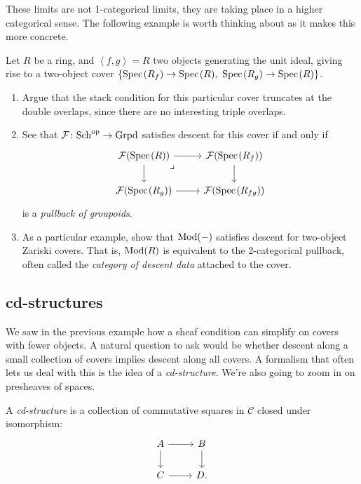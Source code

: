\documentclass[11pt]{amsart}
\begin{document}
\begin{remark} These limits are not 1-categorical limits, they are taking place in a higher categorical sense. The following example is worth thinking about as it makes this more concrete.
\end{remark}

\begin{example} Let $R$ be a ring, and $\left\langle f,g \right\rangle = R$ two objects generating the unit ideal, giving rise to a two-object cover $\left\{ \text{Spec}\hspace{0.1em}(R_f) \to \text{Spec}\hspace{0.1em}(R),\ \text{Spec}\hspace{0.1em}(R_g) \to \text{Spec}\hspace{0.1em}(R) \right\}$.
\begin{enumerate}
    \item Argue that the stack condition for this particular cover truncates at the double overlaps, since there are no interesting triple overlaps.
    \item See that $\mathcal{F} \colon \mathrm{Sch}^{\mathrm{op}} \to \mathrm{Grpd}$ satisfies descent for this cover if and only if
\[ \begin{tikzcd}
    \mathcal{F}(\Spec(R))\rar\dar\pb & \mathcal{F}(\Spec(R_f))\dar\\
    \mathcal{F}(\Spec(R_g))\rar & \mathcal{F}(\Spec(R_{fg}))
\end{tikzcd} \]
is a \textit{pullback of groupoids}.

    \item As a particular example, show that $\mathrm{Mod}(-)$ satisfies descent for two-object Zariski covers. That is, $\mathrm{Mod}(R)$ is equivalent to the 2-categorical pullback, often called the \textit{category of descent data} attached to the cover.
\end{enumerate}
\end{example}

\subsection{cd-structures} We saw in the previous example how a sheaf condition can simplify on covers with fewer objects. A natural question to ask would be whether descent along a small collection of covers implies descent along all covers. A formalism that often lets us deal with this is the idea of a \textit{cd-structure}. We're also going to zoom in on presheaves of spaces.

\begin{definition} A \textit{cd-structure} is a collection of commutative squares in $\mathscr{C}$ closed under isomorphism:
\[ \begin{tikzcd}
    A\rar\dar & B\dar\\
    C\rar & D.
\end{tikzcd} \]
\end{definition}
\end{document}
